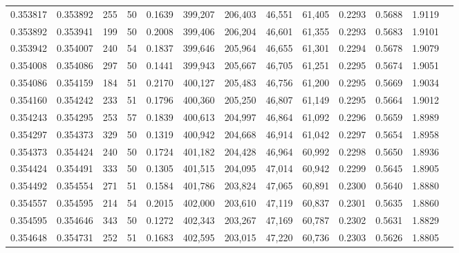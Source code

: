 \begin{tabular}{rrrrrrrrrrrrr}
0.353817 & 0.353892 &   255 &  50 &                                     0.1639 & 399,207 & 206,403 &  46,551 &  61,405 & 0.2293 & 0.5688 & 1.9119 \\
0.353892 & 0.353941 &   199 &  50 &                                     0.2008 & 399,406 & 206,204 &  46,601 &  61,355 & 0.2293 & 0.5683 & 1.9101 \\
0.353942 & 0.354007 &   240 &  54 &                                     0.1837 & 399,646 & 205,964 &  46,655 &  61,301 & 0.2294 & 0.5678 & 1.9079 \\
0.354008 & 0.354086 &   297 &  50 &                                     0.1441 & 399,943 & 205,667 &  46,705 &  61,251 & 0.2295 & 0.5674 & 1.9051 \\
0.354086 & 0.354159 &   184 &  51 &                                     0.2170 & 400,127 & 205,483 &  46,756 &  61,200 & 0.2295 & 0.5669 & 1.9034 \\
0.354160 & 0.354242 &   233 &  51 &                                     0.1796 & 400,360 & 205,250 &  46,807 &  61,149 & 0.2295 & 0.5664 & 1.9012 \\
0.354243 & 0.354295 &   253 &  57 &                                     0.1839 & 400,613 & 204,997 &  46,864 &  61,092 & 0.2296 & 0.5659 & 1.8989 \\
0.354297 & 0.354373 &   329 &  50 &                                     0.1319 & 400,942 & 204,668 &  46,914 &  61,042 & 0.2297 & 0.5654 & 1.8958 \\
0.354373 & 0.354424 &   240 &  50 &                                     0.1724 & 401,182 & 204,428 &  46,964 &  60,992 & 0.2298 & 0.5650 & 1.8936 \\
0.354424 & 0.354491 &   333 &  50 &                                     0.1305 & 401,515 & 204,095 &  47,014 &  60,942 & 0.2299 & 0.5645 & 1.8905 \\
0.354492 & 0.354554 &   271 &  51 &                                     0.1584 & 401,786 & 203,824 &  47,065 &  60,891 & 0.2300 & 0.5640 & 1.8880 \\
0.354557 & 0.354595 &   214 &  54 &                                     0.2015 & 402,000 & 203,610 &  47,119 &  60,837 & 0.2301 & 0.5635 & 1.8860 \\
0.354595 & 0.354646 &   343 &  50 &                                     0.1272 & 402,343 & 203,267 &  47,169 &  60,787 & 0.2302 & 0.5631 & 1.8829 \\
0.354648 & 0.354731 &   252 &  51 &                                     0.1683 & 402,595 & 203,015 &  47,220 &  60,736 & 0.2303 & 0.5626 & 1.8805 \\

\end{tabular}
